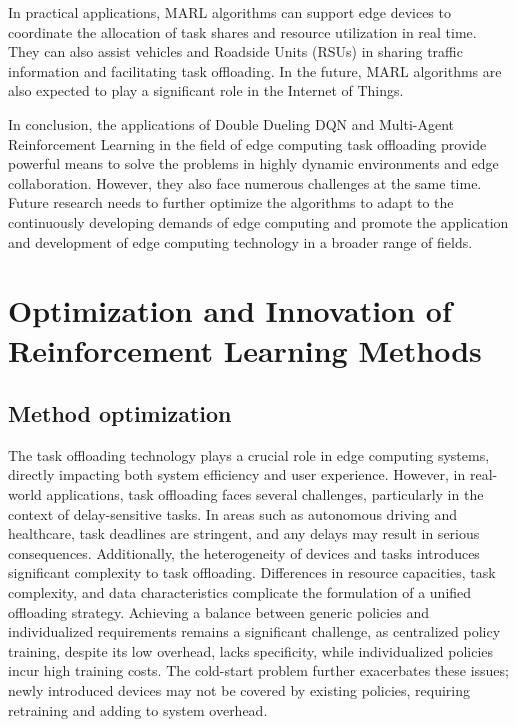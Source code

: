 \documentclass[journal]{IEEEtran}
\begin{document}
In practical applications, MARL algorithms can support edge devices to coordinate the allocation of task shares and resource utilization in real time. They can also assist vehicles and Roadside Units (RSUs) in sharing traffic information and facilitating task offloading. In the future, MARL algorithms are also expected to play a significant role in the Internet of Things.

In conclusion, the applications of Double Dueling DQN and Multi-Agent Reinforcement Learning in the field of edge computing task offloading provide powerful means to solve the problems in highly dynamic environments and edge collaboration. However, they also face numerous challenges at the same time. Future research needs to further optimize the algorithms to adapt to the continuously developing demands of edge computing and promote the application and development of edge computing technology in a broader range of fields.


\section{Optimization and Innovation of Reinforcement Learning Methods}

\subsection{Method optimization}

The task offloading technology plays a crucial role in edge computing systems, directly impacting both system efficiency and user experience. However, in real-world applications, task offloading faces several challenges, particularly in the context of delay-sensitive tasks. In areas such as autonomous driving and healthcare, task deadlines are stringent, and any delays may result in serious consequences. Additionally, the heterogeneity of devices and tasks introduces significant complexity to task offloading. Differences in resource capacities, task complexity, and data characteristics complicate the formulation of a unified offloading strategy. Achieving a balance between generic policies and individualized requirements remains a significant challenge, as centralized policy training, despite its low overhead, lacks specificity, while individualized policies incur high training costs. The cold-start problem further exacerbates these issues; newly introduced devices may not be covered by existing policies, requiring retraining and adding to system overhead.
\end{document}
